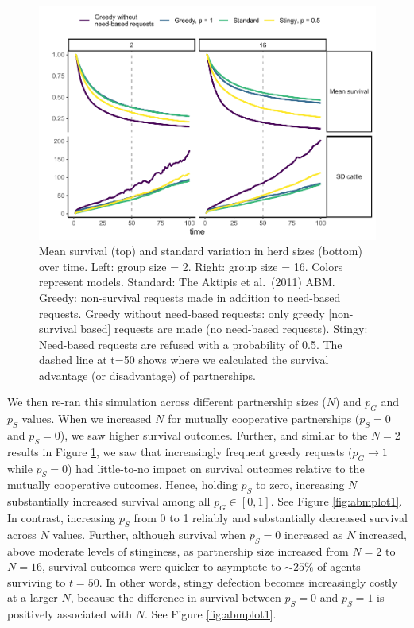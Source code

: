 \documentclass[
]{article}
\begin{document}
\begin{figure}
\centering
\includegraphics{needBasedSharing-paper_files/figure-latex/abmplot0-1.pdf}
\caption{\label{fig:abmplot0}Mean survival (top) and standard variation in herd sizes (bottom) over time. Left: group size = 2. Right: group size = 16. Colors represent models. Standard: The Aktipis et al.~(2011) ABM. Greedy: non-survival requests made in addition to need-based requests. Greedy without need-based requests: only greedy {[}non-survival based{]} requests are made (no need-based requests). Stingy: Need-based requests are refused with a probability of 0.5. The dashed line at t=50 shows where we calculated the survival advantage (or disadvantage) of partnerships.}
\end{figure}

We then re-ran this simulation across different partnership sizes (\(N\)) and \(p_G\) and \(p_S\) values. When we increased \(N\) for mutually cooperative partnerships (\(p_S=0\) and \(p_S=0\)), we saw higher survival outcomes. Further, and similar to the \(N=2\) results in Figure \ref{fig:abmplot0}, we saw that increasingly frequent greedy requests (\(p_G \rightarrow 1\) while \(p_S=0\)) had little-to-no impact on survival outcomes relative to the mutually cooperative outcomes. Hence, holding \(p_S\) to zero, increasing \(N\) substantially increased survival among all \(p_G \in [0,1]\). See Figure \ref{fig:abmplot1}. In contrast, increasing \(p_S\) from 0 to 1 reliably and substantially decreased survival across \(N\) values. Further, although survival when \(p_S=0\) increased as \(N\) increased, above moderate levels of stinginess, as partnership size increased from \(N=2\) to \(N=16\), survival outcomes were quicker to asymptote to \(\sim 25\%\) of agents surviving to \(t=50\). In other words, stingy defection becomes increasingly costly at a larger \(N\), because the difference in survival between \(p_S=0\) and \(p_S=1\) is positively associated with \(N\). See Figure \ref{fig:abmplot1}.
\end{document}
